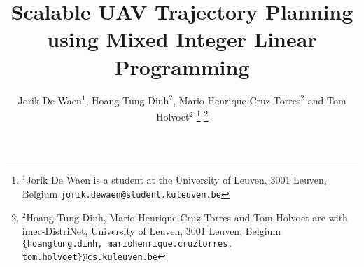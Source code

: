 \documentclass[a4paper, 10pt, conference]{ieeeconf}
\begin{document}
%
\title{Scalable UAV Trajectory Planning \\ using Mixed Integer Linear Programming}





\author{Jorik De Waen$^{1}$, Hoang Tung Dinh$^{2}$, Mario Henrique Cruz Torres$^{2}$ and Tom Holvoet$^{2}$%
\thanks{$^{1}$Jorik De Waen is a student at the University of Leuven, 3001 Leuven, Belgium
        {\tt\small jorik.dewaen@student.kuleuven.be}}%
\thanks{$^{2}$Hoang Tung Dinh,  Mario Henrique Cruz Torres and Tom Holvoet are with imec-DistriNet, University of Leuven, 3001 Leuven, Belgium
        {\tt\small \{hoangtung.dinh, mariohenrique.cruztorres, tom.holvoet\}@cs.kuleuven.be}}%
}

\maketitle
















\end{document}
